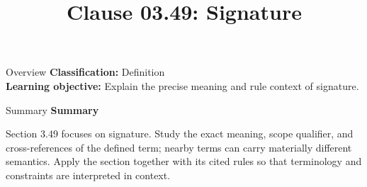 \documentclass[10pt,letterpaper]{article}
\title{Clause 03.49: Signature}
\author{}
\date{}
\begin{document}
\maketitle
\begin{CornellOverviewBox}{Overview}
\textbf{Classification:} Definition\\[2pt]
\textbf{Learning objective:} Explain the precise meaning and rule context of signature.
\end{CornellOverviewBox}\begin{CornellSummaryBox}{Summary}
{\sffamily\bfseries\color{Accent} Summary}\par\vspace{3pt}Section 3.49 focuses on signature. Study the exact meaning, scope qualifier, and cross-references of the defined term; nearby terms can carry materially different semantics. Apply the section together with its cited rules so that terminology and constraints are interpreted in context.
\end{CornellSummaryBox}
\end{document}
